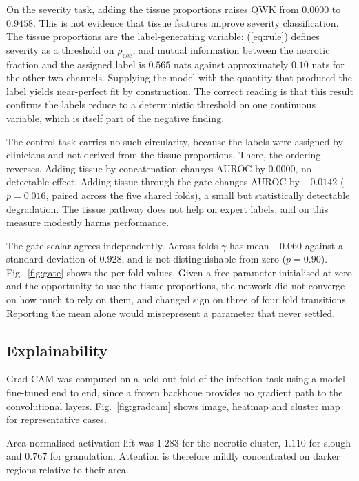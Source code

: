 On the severity task, adding the tissue proportions raises QWK from
$0.0000$ to $0.9458$. This is not evidence that tissue features improve
severity classification. The tissue proportions are the label-generating
variable: (\ref{eq:rule}) defines severity as a threshold on
$\rho_{\text{nec}}$, and mutual information between the necrotic fraction
and the assigned label is $0.565$ nats against approximately $0.10$ nats
for the other two channels. Supplying the model with the quantity that
produced the label yields near-perfect fit by construction. The correct
reading is that this result confirms the labels reduce to a deterministic
threshold on one continuous variable, which is itself part of the negative
finding.

The control task carries no such circularity, because the labels were
assigned by clinicians and not derived from the tissue proportions. There,
the ordering reverses. Adding tissue by concatenation changes AUROC by
$0.0000$, no detectable effect.
Adding tissue through the gate changes AUROC by $-0.0142$ ($p = 0.016$,
paired across the five shared folds), a small but statistically
detectable degradation. The tissue pathway does not help on expert
labels, and on this measure modestly harms performance.

The gate scalar agrees independently. Across folds $\gamma$ has mean
$-0.060$ against a standard deviation of $0.928$, and is not
distinguishable from zero ($p = 0.90$). Fig.~\ref{fig:gate} shows the per-fold values. Given a free
parameter initialised at zero and the opportunity to use the tissue
proportions, the network did not converge on how much to rely on them, and
changed sign on three of four fold transitions. Reporting the mean alone
would misrepresent a parameter that never settled.

\subsection{Explainability}

Grad-CAM was computed on a held-out fold of the infection task using a
model fine-tuned end to end, since a frozen backbone provides no gradient
path to the convolutional layers. Fig.~\ref{fig:gradcam} shows image,
heatmap and cluster map for representative cases.

Area-normalised activation lift was $1.283$ for the necrotic cluster,
$1.110$ for slough and $0.767$ for granulation. Attention is therefore
mildly concentrated on darker regions relative to their area.

